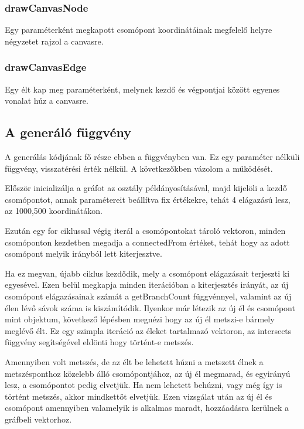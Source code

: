 \subsubsection{drawCanvasNode}
Egy paraméterként megkapott csomópont koordinátáinak megfelelő helyre négyzetet rajzol a canvasre.
\subsubsection{drawCanvasEdge}
Egy élt kap meg paraméterként, melynek kezdő és végpontjai között egyenes vonalat húz a canvasre.
\subsection{A generáló függvény}
A generálás kódjának fő része ebben a függvényben van. Ez egy paraméter nélküli függvény, visszatérési érték nélkül. A következőkben vázolom a működését. 

Először inicializálja a gráfot az osztály példányosításával, majd kijelöli a kezdő csomópontot, annak paramétereit beállítva fix értékekre, tehát 4 elágazású lesz, az 1000,500 koordinátákon. 

Ezután egy for ciklussal végig iterál a csomópontokat tároló vektoron, minden csomóponton kezdetben megadja a connectedFrom értéket, tehát hogy az adott csomópont melyik irányból lett kiterjesztve. 

Ha ez megvan, újabb ciklus kezdődik, mely a csomópont elágazásait terjeszti ki egyesével. Ezen belül megkapja minden iterációban a kiterjesztés irányát, az új csomópont elágazásainak számát a getBranchCount függvénnyel, valamint az új élen lévő sávok száma is kiszámítódik. Ilyenkor már létezik az új él és csomópont mint objektum, következő lépésben megnézi hogy az új él metszi-e bármely meglévő élt. Ez egy szimpla iteráció az éleket tartalmazó vektoron, az intersects függvény segítségével eldönti hogy történt-e metszés.

Amennyiben volt metszés, de az élt be lehetett húzni a metszett élnek a metszésponthoz közelebb álló csomópontjához, az új él megmarad, és egyirányú lesz, a csomópontot pedig elvetjük. Ha nem lehetett behúzni, vagy még így is történt metszés, akkor mindkettőt elvetjük. Ezen vizsgálat után az új él és csomópont amennyiben valamelyik is alkalmas maradt, hozzáadásra kerülnek a gráfbeli vektorhoz.

